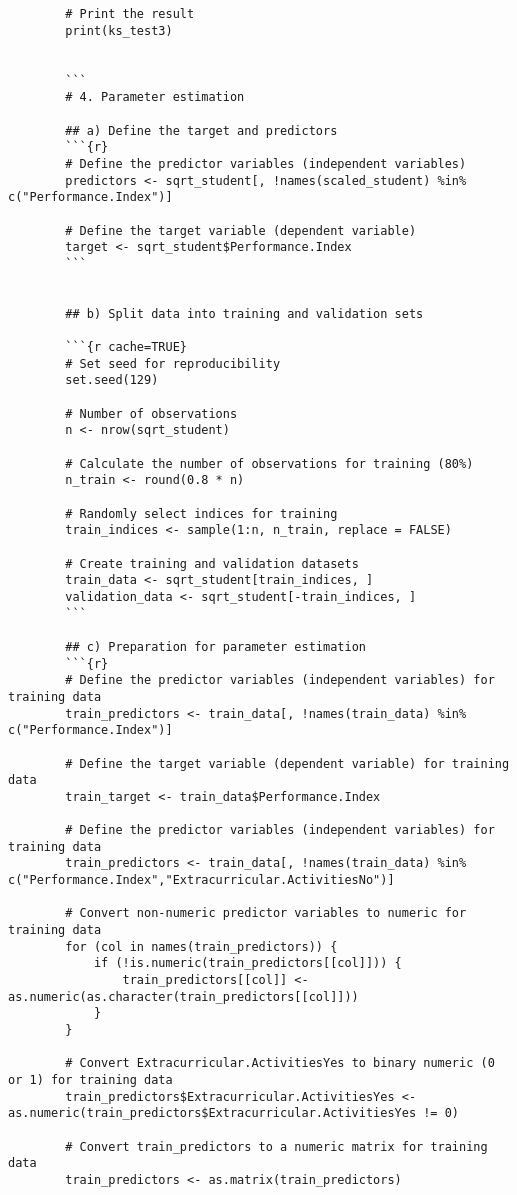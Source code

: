 \documentclass[12pt]{article}
\begin{document}
\begin{lstlisting}
		# Print the result
		print(ks_test3)
		
		
		```
		# 4. Parameter estimation
		
		## a) Define the target and predictors
		```{r}
		# Define the predictor variables (independent variables)
		predictors <- sqrt_student[, !names(scaled_student) %in% c("Performance.Index")]
		
		# Define the target variable (dependent variable)
		target <- sqrt_student$Performance.Index
		```
		
		
		## b) Split data into training and validation sets
		
		```{r cache=TRUE}
		# Set seed for reproducibility
		set.seed(129)
		
		# Number of observations
		n <- nrow(sqrt_student)
		
		# Calculate the number of observations for training (80%)
		n_train <- round(0.8 * n)
		
		# Randomly select indices for training
		train_indices <- sample(1:n, n_train, replace = FALSE)
		
		# Create training and validation datasets
		train_data <- sqrt_student[train_indices, ]
		validation_data <- sqrt_student[-train_indices, ]
		```
		
		## c) Preparation for parameter estimation 
		```{r}
		# Define the predictor variables (independent variables) for training data
		train_predictors <- train_data[, !names(train_data) %in% c("Performance.Index")]
		
		# Define the target variable (dependent variable) for training data
		train_target <- train_data$Performance.Index
		
		# Define the predictor variables (independent variables) for training data
		train_predictors <- train_data[, !names(train_data) %in% c("Performance.Index","Extracurricular.ActivitiesNo")]
		
		# Convert non-numeric predictor variables to numeric for training data
		for (col in names(train_predictors)) {
			if (!is.numeric(train_predictors[[col]])) {
				train_predictors[[col]] <- as.numeric(as.character(train_predictors[[col]]))
			}
		}
		
		# Convert Extracurricular.ActivitiesYes to binary numeric (0 or 1) for training data
		train_predictors$Extracurricular.ActivitiesYes <- as.numeric(train_predictors$Extracurricular.ActivitiesYes != 0)
		
		# Convert train_predictors to a numeric matrix for training data
		train_predictors <- as.matrix(train_predictors)
		

\end{lstlisting}
\end{document}
